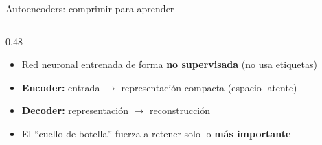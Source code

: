 \documentclass[aspectratio=169, 11pt]{beamer}
\newcommand{\highlight}[1]{\textcolor{uncaccent}{\textbf{#1}}}
\begin{document}
\begin{frame}{Autoencoders: comprimir para aprender}
  \begin{columns}[c]
    \begin{column}{0.48\textwidth}
      \begin{itemize}
        \item Red neuronal entrenada de forma \textbf{no supervisada} (no usa etiquetas)
        \item \textbf{Encoder:} entrada $\rightarrow$ representación compacta (espacio latente)
        \item \textbf{Decoder:} representación $\rightarrow$ reconstrucción
        \item El ``cuello de botella'' fuerza a retener solo lo \highlight{más importante}
      \end{itemize}


\end{column}
\end{columns}
\end{frame}
\end{document}
